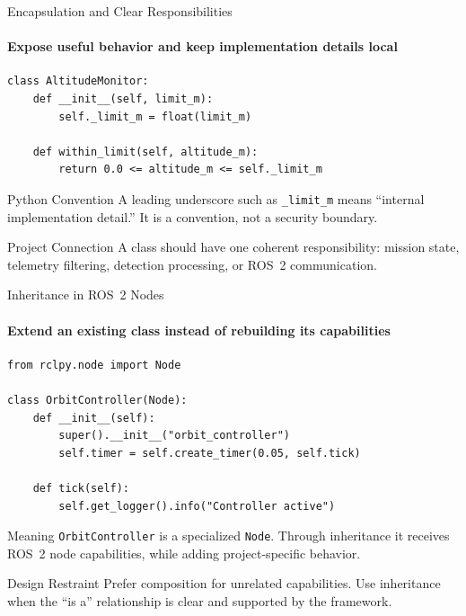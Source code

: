 \begin{frame}[fragile]{Encapsulation and Clear Responsibilities}
\framesubtitle{Expose useful behavior and keep implementation details local}
\begin{verbatim}
class AltitudeMonitor:
    def __init__(self, limit_m):
        self._limit_m = float(limit_m)

    def within_limit(self, altitude_m):
        return 0.0 <= altitude_m <= self._limit_m
\end{verbatim}
\begin{block}{Python Convention}
A leading underscore such as \texttt{\_limit\_m} means ``internal implementation detail.'' It is a convention, not a security boundary.
\end{block}
\begin{exampleblock}{Project Connection}
A class should have one coherent responsibility: mission state, telemetry filtering, detection processing, or ROS~2 communication.
\end{exampleblock}
\end{frame}









\begin{frame}[fragile]{Inheritance in ROS~2 Nodes}
\framesubtitle{Extend an existing class instead of rebuilding its capabilities}

\footnotesize
\begin{verbatim}
from rclpy.node import Node

class OrbitController(Node):
    def __init__(self):
        super().__init__("orbit_controller")
        self.timer = self.create_timer(0.05, self.tick)

    def tick(self):
        self.get_logger().info("Controller active")
\end{verbatim}
\begin{block}{Meaning}
\texttt{OrbitController} is a specialized \texttt{Node}. Through inheritance it receives ROS~2 node capabilities, while adding project-specific behavior.
\end{block}
\begin{alertblock}{Design Restraint}
Prefer composition for unrelated capabilities. Use inheritance when the ``is a'' relationship is clear and supported by the framework.
\end{alertblock}
\end{frame}






